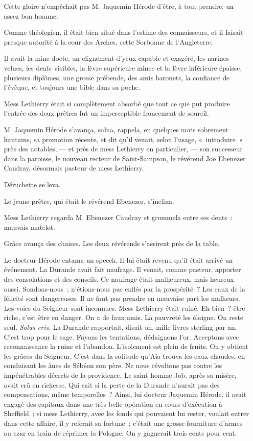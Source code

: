 \documentclass[french,twoside]{book} %
\begin{document}
Cette gloire n’empêchait pas M. Jaquemin Hérode d’être, à tout prendre, un assez bon homme.\par
Comme théologien, il était bien situé dans l’estime des connaisseurs, et il faisait presque autorité à la cour des Arches, cette Sorbonne de l’Angleterre.\par
Il avait la mine docte, un clignement d’yeux capable et exagéré, les narines velues, les dents visibles, la lèvre supérieure mince et la lèvre inférieure épaisse, plusieurs diplômes, une grosse prébende, des amis baronets, la confiance de l’évêque, et toujours une bible dans sa poche.\par
Mess Lethierry était si complètement absorbé que  tout ce que put produire l’entrée des deux prêtres fut un imperceptible froncement de sourcil.\par
M. Jaquemin Hérode s’avança, salua, rappela, en quelques mots sobrement hautains, sa promotion récente, et dit qu’il venait, selon l’usage, « introduire » près des notables, — et près de mess Lethierry en particulier, — son successeur dans la paroisse, le nouveau recteur de Saint-Sampson, le révérend Joë Ebenezer Caudray, désormais pasteur de mess Lethierry.\par
Déruchette se leva.\par
Le jeune prêtre, qui était le révérend Ebenezer, s’inclina.\par
Mess Lethierry regarda M. Ebenezer Caudray et grommela entre ses dents : mauvais matelot.\par
Grâce avança des chaises. Les deux révérends s’assirent près de la table.\par
Le docteur Hérode entama un speech. Il lui était revenu qu’il était arrivé un événement. La Durande avait fait naufrage. Il venait, comme pasteur, apporter des consolations et des conseils. Ce naufrage était malheureux, mais heureux aussi. Sondons-nous ; n’étions-nous pas enflés par la prospérité ? Les eaux de la félicité sont dangereuses. Il ne faut pas prendre en mauvaise part les malheurs. Les voies du Seigneur sont inconnues. Mess Lethierry était ruiné. Eh bien ? être riche, c’est être en danger. On a de faux amis. La pauvreté les éloigne. On reste seul. \emph{Solus eris.} La Durande rapportait, disait-on, mille livres sterling par an. C’est trop pour le sage. Fuyons les tentations,  dédaignons l’or. Acceptons avec reconnaissance la ruine et l’abandon. L’isolement est plein de fruits. On y obtient les grâces du Seigneur. C’est dans la solitude qu’Aia trouva les eaux chaudes, en conduisant les ânes de Sébéon son père. Ne nous révoltons pas contre les impénétrables décrets de la providence. Le saint homme Job, après sa misère, avait crû en richesse. Qui sait si la perte de la Durande n’aurait pas des compensations, même temporelles ? Ainsi, lui docteur Jaquemin Hérode, il avait engagé des capitaux dans une très belle opération en cours d’exécution à Sheffield ; si mess Lethierry, avec les fonds qui pouvaient lui rester, voulait entrer dans cette affaire, il y referait sa fortune ; c’était une grosse fourniture d’armes au czar en train de réprimer la Pologne. On y gagnerait trois cents pour cent.\par
\end{document}
